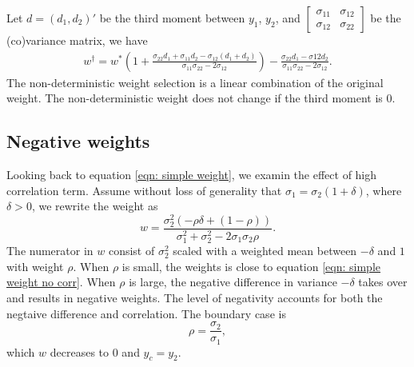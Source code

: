 \documentclass[]{article}
\begin{document}
Let \(d = (d_1, d_2)'\) be the third moment between \(y_1\), \(y_2\),
and
\(\begin{bmatrix} \sigma_{11} & \sigma_{12}\\ \sigma_{12} & \sigma_{22}\end{bmatrix}\)
be the (co)variance matrix, we have \begin{equation}
\label{eqn: w w/ var w}
\begin{aligned}
w^\dagger = w^*(1+\frac{\sigma_{22} d_1 + \sigma_{11} d_2 -\sigma_{12} (d_1 + d_2)}{\sigma_{11}\sigma_{22} - 2\sigma_{12}}) - \frac{\sigma_{22} d_1 - \sigma{12}d_2}{\sigma_{11}\sigma_{22} - 2\sigma_{12}}.
\end{aligned}
\end{equation} The non-deterministic weight selection is a linear
combination of the original weight. The non-deterministic weight does
not change if the third moment is \(0\).

\hypertarget{negative-weights}{%
\subsection{Negative weights}\label{negative-weights}}

Looking back to equation \ref{eqn: simple weight}, we examin the effect
of high correlation term. Assume without loss of generality that
\(\sigma_1 =\sigma_2 (1 + \delta)\), where \(\delta>0\), we rewrite the
weight as \begin{equation}
\label{eqn: w high corr}
w = \frac{\sigma_2^2(-\rho\delta+ (1-\rho))}{\sigma_1^2+\sigma_2^2 -2\sigma_1\sigma_2\rho}.
\end{equation} The numerator in \(w\) consist of \(\sigma_2^2\) scaled
with a weighted mean between \(-\delta\) and \(1\) with weight \(\rho\).
When \(\rho\) is small, the weights is close to equation
\ref{eqn: simple weight no corr}. When \(\rho\) is large, the negative
difference in variance \(-\delta\) takes over and results in negative
weights. The level of negativity accounts for both the negtaive
difference and correlation. The boundary case is \begin{equation}
\label{eqn: corr boundary}
\rho = \frac{\sigma_2}{\sigma_1},
\end{equation} which \(w\) decreases to \(0\) and \(y_c = y_2\).
\end{document}
